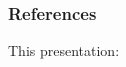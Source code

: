 \documentclass[11pt,
               aspectratio=43,
               hyperref={colorlinks}
               ]{beamer}
\begin{document}

	\begin{frame}[t, allowframebreaks]
	
		\frametitle{References}	
		
			This presentation:\\
					
		\framebreak		
		
		\printbibliography
		
	\end{frame}
\end{document}

